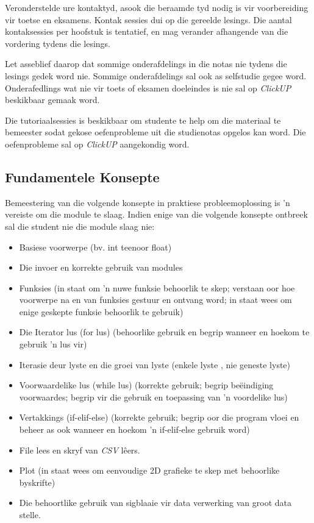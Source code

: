         Veronderstelde ure kontaktyd, asook die beraamde tyd nodig is vir
        voorbereiding vir toetse en eksamens. Kontak sessies dui op die
        gereelde lesings. Die aantal kontaksessies per hoofstuk is tentatief,
        en mag verander afhangende van die vordering tydens die lesings.

        Let asseblief daarop dat sommige onderafdelings in die notas nie tydens
        die lesings gedek word nie. Sommige onderafdelings sal ook as
        selfstudie gegee word.  Onderafedlings wat nie vir toets of eksamen
        doeleindes is nie sal op \textit{ClickUP} beskikbaar gemaak word.

        Die tutoriaalsessies is beskikbaar om studente te help om die materiaal
        te bemeester sodat gekose oefenprobleme uit die studienotas opgelos kan
        word. Die oefenprobleme sal op \textit{ClickUP} aangekondig word.

	\subsection{Fundamentele Konsepte}
        Bemeestering van die volgende konsepte in praktiese probleemoplossing
        is 'n vereiste om die module te slaag. Indien enige van die volgende
        konsepte ontbreek sal die student nie die module slaag nie:
        \begin{itemize}
            \item Basiese voorwerpe (bv. int teenoor float)
            \item Die invoer en korrekte gebruik van modules
            \item Funksies (in staat om 'n nuwe funksie behoorlik te skep;
                verstaan oor hoe voorwerpe na en van funksies gestuur en
                ontvang word; in staat wees om enige geskepte funksie behoorlik
                te gebruik)
            \item Die Iterator lus (for  lus) (behoorlike gebruik en begrip
                wanneer en hoekom te gebruik 'n lus vir)
            \item Iterasie deur lyste en die groei van lyste (enkele lyste ,
                nie geneste lyste)
            \item Voorwaardelike lus (while lus) (korrekte gebruik; begrip
                be\"eindiging voorwaardes; begrip vir die gebruik en toepassing
                van 'n voordelike lus)
            \item Vertakkings (if-elif-else) (korrekte gebruik; begrip oor die
                program vloei en beheer as ook wanneer en hoekom 'n
                if-elif-else gebruik word)
            \item File lees en skryf van \emph{CSV} lêers.
            \item Plot (in staat wees om eenvoudige 2D grafieke te skep met
                behoorlike byskrifte)
            \item Die behoortlike gebruik van sigblaaie vir data verwerking van
                groot data stelle.
        \end{itemize}

